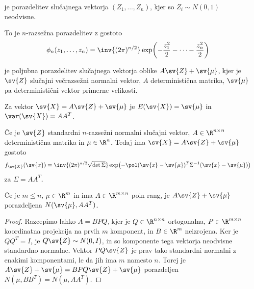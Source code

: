 
\begin{definicija}
   je porazdelitev
  slučajnega vektorja $(Z_1, \ldots, Z_n)$, kjer so $Z_i \sim N(0, 1)$
  neodvisne.
\end{definicija}

\begin{opomba}
  To je $n$-razsežna porazdelitev z gostoto
  \[
	\phi_n(z_1, \ldots, z_n) = \inv{(2 \pi)^{n/2}} \exp\!\left( -
	  \frac{z_1^2}{2} - \cdots - \frac{z_n^2}{2} \right)
  \]
\end{opomba}

\begin{definicija}
   je poljubna porazdelitev slučajnega
  vektorja oblike $A \sv{Z} + \sv{\mu}$, kjer je $\sv{Z}$ slučajni večrazsežni
  normalni vektor, $A$ deterministična matrika, $\sv{\mu}$ pa deterministični
  vektor primerne velikosti.
\end{definicija}

\begin{opomba}
  Za vektor $\sv{X} = A \sv{Z} + \sv{\mu}$ je $E(\sv{X}) = \sv{\mu}$ in
  $\var(\sv{X}) = A A^T$.
\end{opomba}


Če je $\sv{Z}$ standardni $n$-razsežni normalni slučajni vektor, $A \in \R^{n
  \times n}$ deterministična matrika in $\mu \in \R^n$.
Tedaj ima $\sv{X} = A \sv{Z} + \sv{\mu}$ gostoto
\[
  f_{\sv{X}}(\sv{x})
  = \inv{(2 \pi)^{n/2} \sqrt{\det \Sigma}} \exp\!\left( - \pol (\sv{x} -
	\sv{\mu})^T \Sigma^{-1} (\sv{x} - \sv{\mu}) \right)
\]
za $\Sigma = A A^T$.

\begin{trditev}
  Če je $m \le n$, $\mu \in \R^m$ in ima $A \in \R^{m \times n}$ poln rang, je
  $A \sv{Z} + \sv{\mu}$ porazdeljena $N(\sv{\mu}, A A^T)$.
\end{trditev}

\begin{proof}
  Razcepimo lahko $A = B P Q$, kjer je $Q \in \R^{n \times n}$ ortogonalna, $P
  \in \R^{m \times n}$ koordinatna projekcija na prvih $m$ komponent, in $B \in
  \R^m$ neizrojena.
  Ker je $Q Q^T = I$, je $Q \sv{Z} \sim N(0, I)$, in so komponente tega vektorja
  neodvisne standardno normalne.
  Vektor $P Q \sv{Z}$ je prav tako standardni normalni z enakimi komponentami,
  le da jih ima $m$ namesto $n$.
  Torej je $A \sv{Z} + \sv{\mu} = B P Q \sv{Z} + \sv{\mu}$ porazdeljen $N(\mu, B
  B^T) = N(\mu, A A^T)$.
\end{proof}

